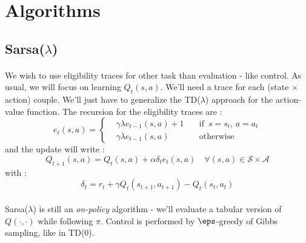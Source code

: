 \documentclass[a4paper]{article}
\newcommand\mS{\mathcal{S}}
\newcommand\mA{\mathcal{A}}
\newcommand\tdl{TD($\lambda$)}
\newcommand\srsl{Sarsa($\lambda$)}
\begin{document}
	\section{Algorithms}
	{
		\subsection{Sarsa($\lambda$)}
		{
			\paragraph{} We wish to use eligibility traces for other task than evaluation - like control. As usual, we will focus on learning $Q_t(s,a)$. We'll need a trace for each (state $\times$ action) couple. We'll just have to generalize the \tdl{} approach for the action-value function. The recursion for the eligibility traces are : 
			\begin{equation}
				e_t(s,a) = \left\{
					\begin{aligned}
						&\gamma \lambda e_{t-1}(s,a) +1 \quad &\text{if }\, s=s_t, \, a = a_t \\
						& \gamma \lambda e_{t-1}(s,a) &\text{otherwise}
					\end{aligned}\right.
			\end{equation}
			and the update will write : 
			\begin{equation}
				Q_{t+1}(s,a) = Q_t(s,a) + \alpha \delta_t e_t(s,a) \quad \forall(s,a)\in\mS\times\mA
			\end{equation}
			with : 
			\begin{equation}
				\delta_t = r_t + \gamma Q_t(s_{t+1},a_{t+1}) - Q_t(s_t,a_t)
			\end{equation}
			
			\paragraph{} \srsl{} is still an \emph{on-policy} algorithm - we'll evaluate a tabular version of $Q(\cdot,\cdot)$ while following $\pi$. Control is performed by $\eps$-greedy of Gibbs sampling, like in TD(0). 
			\vspace{10pt}
			
}}
\end{document}
